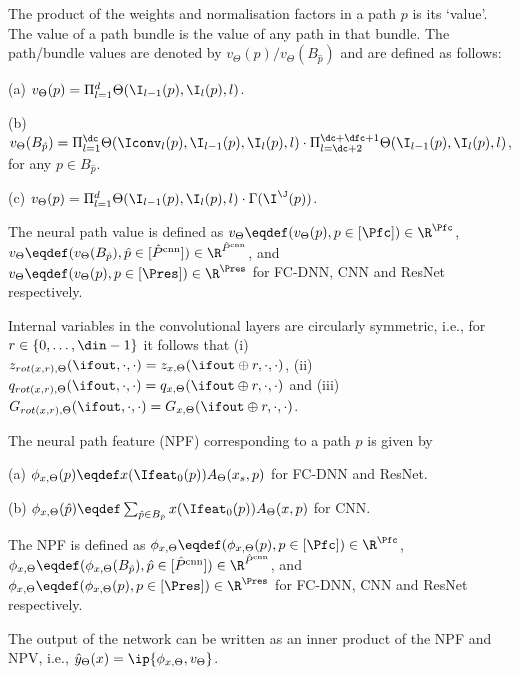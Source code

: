 \begin{definition}
The product of the weights and normalisation factors in a path $p$ is its `value'. The value of a path bundle is the value of any path in that bundle. The path/bundle values are denoted by $v_{\Theta}(p)/v_{\Theta}(B_{\hat{p}})$ and are defined as follows:

(a) $v_{\Theta}(p)=\Pi_{l=1}^d \Theta(\I_{l-1}(p),\I_l(p),l)$.


(b) $v_{\Theta}(B_{\hat{p}})= \Pi_{l=1}^{\dc} \Theta(\Iconv_{l}(p),\I_{l-1}(p),\I_{l}(p),l) \cdot \Pi_{l=\dc+2}^{\dc+\dfc+1} \Theta(\I_{l-1}(p),\I_l(p),l)$, for any $p\in B_{\hat{p}}$.

(c) $v_{\Theta}(p)=\Pi_{l=1}^d \Theta(\I_{l-1}(p),\I_l(p),l) \cdot \Gamma(\I^{\J}(p))$.

The neural path value is defined as $v_{\Theta}\eqdef (v_{\Theta}(p),p\in [\Pfc])\in\R^{\Pfc}$, $v_{\Theta}\eqdef (v_{\Theta}(B_{\hat{p}}),\hat{p}\in [\hat{P}^{\text{cnn}}])\in\R^{\hat{P}^{\text{cnn}}}$, and $v_{\Theta}\eqdef (v_{\Theta}(p),p\in [\Pres])\in\R^{\Pres}$ for FC-DNN, CNN and ResNet respectively.
 \end{definition}
\begin{proposition}\label{prop:rot}
Internal variables in the convolutional layers are circularly symmetric,  i.e., for $r\in\{0,\ldots,\din-1\}$ it follows that (i) $z_{rot(x,r),\Theta}(\ifout,\cdot,\cdot) = z_{x,\Theta}(\ifout \oplus r,\cdot,\cdot)$, (ii) $q_{rot(x,r),\Theta}(\ifout,\cdot,\cdot) = q_{x,\Theta}(\ifout \oplus r,\cdot,\cdot)$ and (iii) $G_{rot(x,r),\Theta}(\ifout,\cdot,\cdot) = G_{x,\Theta}(\ifout \oplus r,\cdot,\cdot)$.
\end{proposition}
\begin{definition}
The neural path feature (NPF) corresponding to a path $p$ is given by 

(a) $\phi_{x,\Theta}(p)\eqdef  x(\Ifeat_0(p))A_{\Theta}(x_s,p)$ for  FC-DNN and ResNet.

(b) $\phi_{x,\Theta}(\hat{p})\eqdef \sum_{\hat{p}\in B_{\hat{p}}}x(\Ifeat_0(p))A_{\Theta}(x,p)$ for CNN.

The NPF is defined as $\phi_{x,\Theta}\eqdef (\phi_{x,\Theta}(p),p\in [\Pfc])\in\R^{\Pfc}$, $\phi_{x,\Theta}\eqdef (\phi_{x,\Theta}(B_{\hat{p}}),\hat{p}\in [\hat{P}^{\text{cnn}}])\in\R^{\hat{P}^{\text{cnn}}}$, and $\phi_{x,\Theta}\eqdef (\phi_{x,\Theta}(p),p\in [\Pres])\in\R^{\Pres}$ for FC-DNN, CNN and ResNet respectively.
\end{definition}
\begin{proposition}[Output=$\langle$NPF,NPV$\rangle$]\label{prop:zero}  The output of the network can be written as an inner product of the NPF and NPV, i.e., 
$\hat{y}_{\Theta}(x)=\ip{\phi_{x,\Theta},v_{\Theta}}$.
\end{proposition}

